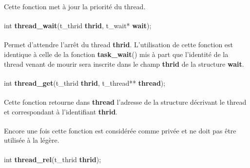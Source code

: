 \documentclass[10pt,a4wide]{article}
\begin{document}
Cette fonction met \`a jour la priorit\'e du thread.

\paragraph{}

\hspace{1.5cm}int \textbf{thread\_wait}(t\_thrid \textbf{thrid},
                                        t\_wait* \textbf{wait});

\paragraph{}

Permet d'attendre l'arr\^et du thread \textbf{thrid}. L'utilisation
de cette fonction est identique \`a celle de la fonction
\textbf{task\_wait}() mis \`a part que l'identit\'e de la thread
venant de mourir sera inscrite dans le champ \textbf{thrid} de la structure
\textbf{wait}.

\paragraph{}

\hspace{1.5cm}int \textbf{thread\_get}(t\_thrid \textbf{thrid},
                                       t\_thread** \textbf{thread});

\paragraph{}

Cette fonction retourne dans \textbf{thread} l'adresse de la structure
d\'ecrivant le thread et correspondant \`a l'identifiant \textbf{thrid}.

\paragraph{}

Encore une fois cette fonction est consid\'er\'ee comme priv\'ee et ne
doit pas \^etre utilis\'ee \`a la l\'eg\`ere.

\paragraph{}

\hspace{1.5cm}int \textbf{thread\_rel}(t\_thrid \textbf{thrid});
\end{document}
